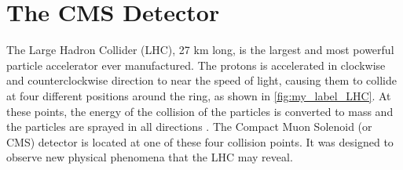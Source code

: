 \chapter{\label{CMS}The CMS Detector}
The  Large Hadron Collider (LHC), 27 km long, is the largest and most powerful particle accelerator ever manufactured. The protons is accelerated in clockwise and counterclockwise direction to near the speed of light, causing them to collide at four different positions around the ring, as shown in \autoref{fig:my_label_LHC}. At these points, the energy of the collision of the particles is converted to mass and the particles are sprayed in all directions \cite{CMS_1}. The Compact Muon Solenoid (or CMS) detector is located at one of these four collision points. It was designed to observe  new physical phenomena that the LHC may reveal.



